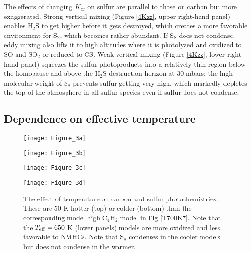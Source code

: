 \documentclass[preprint]{aastex6}
\begin{document}
The effects of changing $K_{zz}$ on sulfur are parallel to those on carbon but more exaggerated. 
Strong vertical mixing (Figure \ref{4Kzz}, upper right-hand panel) enables H$_2$S to get higher before it gets destroyed,
which creates a more favorable environment for S$_2$, which becomes rather abundant.
If S$_8$ does not condense,
eddy mixing also lifts it to high altitudes where it is photolyzed and oxidized to SO and SO$_2$ or reduced to CS. 
Weak vertical mixing (Figure \ref{4Kzz}, lower right-hand panel) squeezes the sulfur photoproducts into a relatively thin region below
the homopause and above the H$_2$S destruction horizon at 30 mbars; 
the high molecular weight of S$_8$ prevents sulfur getting very high, which markedly depletes the top of the
atmosphere in all sulfur species even if sulfur does not condense. 


\subsection{Dependence on effective temperature}

\begin{figure}[!htb]
 \centering
 \begin{minipage}[c]{0.49\textwidth}
   \centering
  \texttt{[image: Figure\_3a]} 
 \end{minipage}
 \begin{minipage}[c]{0.49\textwidth}
   \centering
 \texttt{[image: Figure\_3b]} 
 \end{minipage}
 \centering
 \begin{minipage}[c]{0.49\textwidth}
   \centering
 \texttt{[image: Figure\_3c]} 
 \end{minipage}
 \begin{minipage}[c]{0.49\textwidth}
   \centering
 \texttt{[image: Figure\_3d]} 
 \end{minipage}
 \caption{\small The effect of temperature on carbon and sulfur photochemistries. 
  These are 50 K hotter (top) or colder (bottom) than the corresponding model high C$_4$H$_2$ model in Fig \ref{T700K7}.
  Note that the $T_{\rm eff}=650$ K (lower panels) models are more oxidized and
  less favorable to NMHCs. Note that S$_8$ condenses in the cooler models
  but does not condense in the warmer.}
\label{4Temp}
\end{figure}
\end{document}
